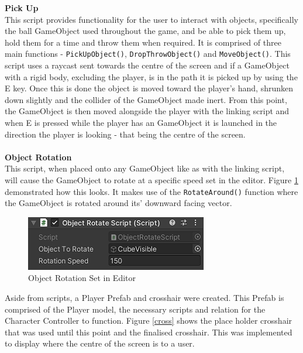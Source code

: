\noindent \textbf{Pick Up}\\
This script provides functionality for the user to interact with objects, specifically the ball GameObject used throughout the game, and be able to pick them up, hold them for a time and throw them when required. It is comprised of three main functions - \texttt{PickUpObject()}, \texttt{DropThrowObject()} and \texttt{MoveObject()}. This script uses a raycast sent towards the centre of the screen and if a GameObject with a rigid body, excluding the player, is in the path it is picked up by using the E key. Once this is done the object is moved toward the player's hand, shrunken down slightly and the collider of the GameObject made inert. From this point, the GameObject is then moved alongside the player with the linking script and when E is pressed while the player has an GameObject it is launched in the direction the player is looking - that being the centre of the screen.
\\\\
\textbf{Object Rotation}\\
This script, when placed onto any GameObject like as with the linking script, will cause the GameObject to rotate at a specific speed set in the editor. Figure \ref{rot} demonstrated how this looks. It makes use of the \texttt{RotateAround()} function where the GameObject is rotated around its' downward facing vector.

\begin{figure}[H]
\centering
\includegraphics[scale=1.25]{Figures/rot.png}
\caption{Object Rotation Set in Editor}
\label{rot}
\end{figure}

\noindent Aside from scripts, a Player Prefab and crosshair were created. This Prefab is comprised of the Player model, the necessary scripts and relation for the Character Controller to function. Figure \ref{cross} shows the place holder crosshair that was used until this point and the finalised crosshair. This was implemented to display where the centre of the screen is to a user.

